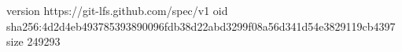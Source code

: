version https://git-lfs.github.com/spec/v1
oid sha256:4d2d4eb493785393890096fdb38d22abd3299f08a56d341d54e3829119cb4397
size 249293

